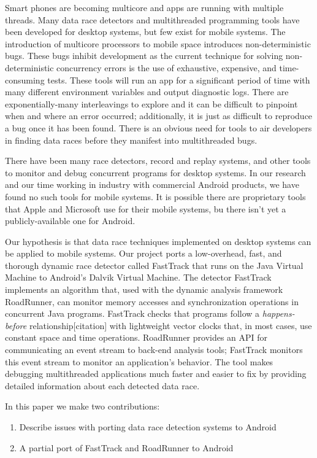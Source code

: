 \documentclass{acm_proc_article-sp}
\begin{document}
Smart phones are becoming multicore and apps are running  with multiple threads. Many data race detectors and multithreaded programming tools have been developed for desktop systems, but few exist for mobile systems. The introduction of multicore processors to mobile space introduces non-deterministic bugs. These bugs inhibit development as the current technique for solving non-deterministic concurrency errors is the use of exhaustive, expensive, and time-consuming tests. These tools will run an app for a significant period of time with many different environment variables and output diagnostic logs. There are exponentially-many interleavings to explore and it can be difficult to pinpoint when and where an error occurred; additionally, it is just as difficult to reproduce a bug once it has been found. There is an obvious need for tools to air developers in finding data races before they manifest into multithreaded bugs.

There have been many race detectors, record and replay systems, and other tools to monitor and debug concurrent programs for desktop systems. In our research and our time working in industry with commercial Android products, we have found no such tools for mobile systems. It is possible there are proprietary tools that Apple and Microsoft use for their mobile systems, bu there isn't yet a publicly-available one for Android.
 
Our hypothesis is that data race techniques implemented on desktop systems can be applied to mobile systems. Our project ports a low-overhead, fast, and thorough dynamic race detector called FastTrack that runs on the Java Virtual Machine to Android's Dalvik Virtual Machine. The detector FastTrack \cite{Flanagan2009} implements an algorithm that, used with the dynamic analysis framework RoadRunner, can monitor memory accesses and synchronization operations in concurrent Java programs. FastTrack checks that programs follow a \emph{happens-before} relationship[citation] with lightweight vector clocks that, in most cases, use constant space and time operations. RoadRunner provides an API for communicating an event stream to back-end analysis tools; FastTrack monitors this event stream to monitor an application's behavior. The tool makes debugging multithreaded applications much faster and easier to fix by providing detailed information about each detected data race.
 
In this paper we make two contributions:
\begin{enumerate}
\item Describe issues with porting data race detection systems to Android
\item A partial port of FastTrack and RoadRunner to Android
\end{enumerate}
\end{document}
